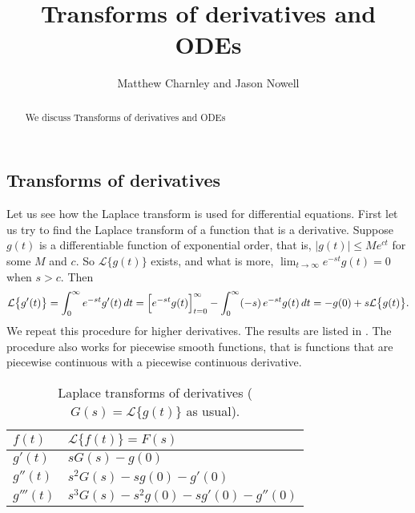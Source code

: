 \documentclass{ximera}
\title{Transforms of derivatives and ODEs}
\author{Matthew Charnley and Jason Nowell}
\begin{document}
\begin{abstract}
    We discuss Transforms of derivatives and ODEs
\end{abstract}
\maketitle

\label{transformsofders:section}





\subsection{Transforms of derivatives}

Let us see how the Laplace transform is used for differential equations. First let us try to find the Laplace transform of a function that is a derivative.  Suppose $g(t)$ is a differentiable function of exponential order, that is, $\lvert g(t) \rvert \leq M e^{ct}$ for some $M$ and $c$.  So $\mathcal{L} \bigl\{ g(t) \bigr\}$ exists, and what is more, $\lim_{t\to\infty} e^{-st}g(t) = 0$ when $s > c$.  Then
\begin{equation*}
    \mathcal{L} \bigl\{ g'(t) \bigr\} = \int_0^\infty e^{-st} g'(t) \,dt = \Bigl[e^{-st} g(t) \Bigr]_{t=0}^\infty - \int_0^\infty (-s)\, e^{-st} g(t) \,dt = -g(0) + s \mathcal{L} \bigl\{ g(t) \bigr\} .
\end{equation*}
We repeat this procedure for higher derivatives. The results are listed in .  The procedure also works for piecewise smooth functions, that is functions that are piecewise continuous with a piecewise continuous derivative.

\begin{table}[h!t]
    \mybeginframe
    \capstart
    \begin{center}
        \begin{tabular}{@{}ll@{}}
            \toprule
            $f(t)$ & $\mathcal{L} \bigl\{ f(t) \bigr\} = F(s)$ \\
            \midrule
            $g'(t)$ & $sG(s)-g(0)$ \\[4pt]
            $g''(t)$ & $s^2G(s)-sg(0)-g'(0)$ \\[4pt]
            $g'''(t)$ & $s^3G(s)-s^2g(0)-sg'(0)-g''(0)$ \\[4pt]
            \bottomrule
        \end{tabular}
    \end{center}
    \caption{Laplace transforms of derivatives ($G(s) = \mathcal{L} \bigl\{ g(t) \bigr\}$ as usual).\label{ltd:table}}
    \myendframe
\end{table}
\end{document}

